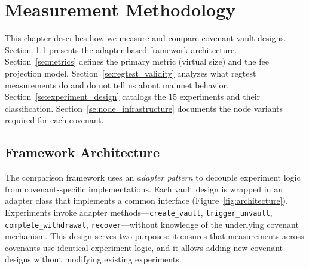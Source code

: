 \chapter{Measurement Methodology} \label{ch:methodology}

This chapter describes how we measure and compare covenant vault designs.
Section~\ref{se:framework} presents the adapter-based framework architecture.
Section~\ref{se:metrics} defines the primary metric (virtual size) and the fee
projection model. Section~\ref{se:regtest_validity} analyzes what regtest measurements
do and do not tell us about mainnet behavior. Section~\ref{se:experiment_design}
catalogs the 15 experiments and their classification.
Section~\ref{se:node_infrastructure} documents the node variants required for each
covenant.

\section{Framework Architecture} \label{se:framework}

The comparison framework uses an \emph{adapter pattern} to decouple experiment logic
from covenant-specific implementations. Each vault design is wrapped in an adapter
class that implements a common interface (Figure~\ref{fig:architecture}). Experiments
invoke adapter methods---\texttt{create\_vault}, \texttt{trigger\_unvault},
\texttt{complete\_withdrawal}, \texttt{recover}---without knowledge of the underlying
covenant mechanism. This design serves two purposes: it ensures that measurements
across covenants use identical experiment logic, and it allows adding new covenant
designs without modifying existing experiments.

